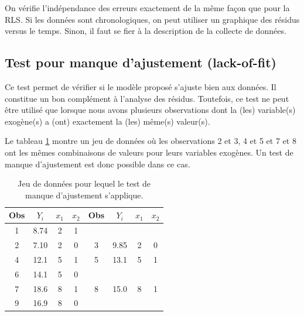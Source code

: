 On vérifie l'indépendance des erreurs exactement de la même façon que pour la RLS. Si les données sont chronologiques, on peut utiliser un graphique des résidus versus le temps. Sinon, il faut se fier à la description de la collecte de données.

\newpage
\subsection{Test pour manque d'ajustement (lack-of-fit)}
\label{sec:testAjustement}

Ce test permet de vérifier si le modèle proposé s'ajuste bien
aux données. Il constitue un bon complément à l'analyse des
résidus. Toutefois, ce test ne peut être utilisé que lorsque nous avons plusieurs observations dont la (les) variable(s) exogène(s) a (ont) exactement la (les) m\^eme(s) valeur(s).

\begin{exemple}
\label{lof1}
Le tableau \ref{jeuLOF} montre un jeu de données où les observations 2 et 3, 4 et 5 et 7 et 8 ont les m\^emes combinaisons de valeurs pour leurs variables exogènes. Un test de manque d'ajustement est donc possible dans ce cas.

\begin{table}[h!]
\begin{center}
\begin{tabular}{||cccc||cccc||}\hline\hline
Obs & $Y_i$ & $x_{1}$ & $x_{2}$ & Obs & $Y_i$ & $x_{1}$
& $x_{2}$ \\ \hline\hline
 1 &  8.74 & 2 & 1 &&&& \\
 2 & 7.10 & 2 & 0 & 3 & 9.85 & 2 & 0 \\ 4 & 12.1 & 5 & 1 & 5 & 13.1 & 5 & 1 \\
 6 & 14.1 & 5 & 0 &&&& \\
 7 & 18.6 & 8 & 1 & 8 & 15.0 & 8 & 1 \\
 9 & 16.9 & 8 & 0 &&&& \\
\hline\hline
\end{tabular}\end{center}
\caption{Jeu de données pour lequel le test de manque d'ajustement s'applique.}
\label{jeuLOF}
\end{table}
\end{exemple}

